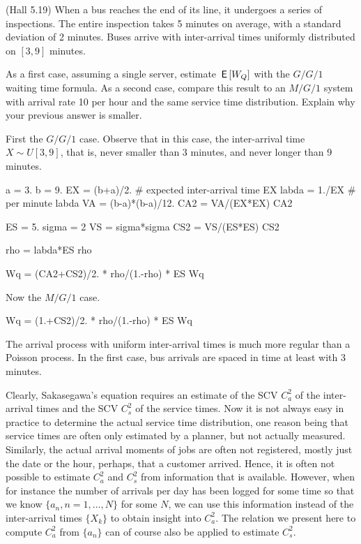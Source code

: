 \begin{exercise}
  (Hall 5.19) When a bus reaches the end of its line, it undergoes a
  series of inspections. The entire inspection takes 5 minutes on
  average, with a standard deviation of 2 minutes. Buses arrive with
  inter-arrival times uniformly distributed on $[3,9]$ minutes.

As a first case,  assuming a single server, estimate $\,\mathsf{E}\left[W_Q\right]$ with the $G/G/1$ waiting time formula. As a second case, compare this result to an $M/G/1$ system with arrival rate 10 per hour and the same service time distribution. Explain why your previous answer is smaller. 
\begin{solution}
First the $G/G/1$ case. Observe that in this case, the inter-arrival time $X\sim U[3,9]$, that is, never smaller than 3 minutes, and never longer than 9 minutes. 

\begin{pyconsole}
  
a = 3.
b = 9. 
EX = (b+a)/2. # expected inter-arrival time
EX
labda = 1./EX # per minute
labda
VA = (b-a)*(b-a)/12.
CA2 = VA/(EX*EX)
CA2

ES = 5.
sigma = 2
VS = sigma*sigma
CS2 = VS/(ES*ES)
CS2

rho = labda*ES
rho

Wq = (CA2+CS2)/2. * rho/(1.-rho) * ES
Wq
\end{pyconsole}

Now  the $M/G/1$ case.

\begin{pyconsole}
Wq = (1.+CS2)/2. * rho/(1.-rho) * ES
Wq
\end{pyconsole}

The arrival process with uniform inter-arrival times is much more
regular than a Poisson process. In the first case, bus arrivals are
spaced in time at least with 3 minutes.
\end{solution}
\end{exercise}



Clearly, Sakasegawa's equation requires an estimate of the SCV $C_a^2$ of the inter-arrival times and the SCV $C_s^2$ of the service times.
Now it is not always easy in practice to determine the actual service time distribution, one reason being that service times are often only estimated by a planner, but not actually measured.
Similarly, the actual arrival moments of jobs are often not registered, mostly just the date or the hour, perhaps, that a customer arrived.
Hence, it is often not possible to estimate $C_a^2$ and $C_s^2$ from information that is available.
However, when for instance the number of arrivals per day has been logged for some time so that we know $\{a_n, n=1,\ldots, N\}$ for some $N$, we can use this information instead of the inter-arrival times $\{X_k\}$ to obtain insight into $C_a^2$.
The relation we present here to compute $C_a^2$ from $\{a_n\}$ can of course also be applied to estimate $C_s^2$.

